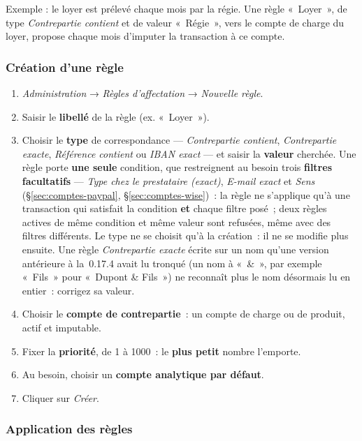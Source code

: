 \documentclass[a4paper,11pt,oneside]{article}
\begin{document}
Exemple : le loyer est prélevé chaque mois par la régie. Une règle «~Loyer~», de type \emph{Contrepartie contient} et de valeur «~Régie~», vers le compte de charge du loyer, propose chaque mois d'imputer la transaction à ce compte.

\subsubsection{Création d'une règle}

\begin{enumerate}
    \item \emph{Administration} → \emph{Règles d'affectation} → \emph{Nouvelle règle}.
    \item Saisir le \textbf{libellé} de la règle (ex. «~Loyer~»).
    \item Choisir le \textbf{type} de correspondance --- \emph{Contrepartie contient}, \emph{Contrepartie exacte}, \emph{Référence contient} ou \emph{IBAN exact} --- et saisir la \textbf{valeur} cherchée. Une règle porte \textbf{une seule} condition, que restreignent au besoin trois \textbf{filtres facultatifs} --- \emph{Type chez le prestataire (exact)}, \emph{E-mail exact} et \emph{Sens} (\S\ref{sec:comptes-paypal}, \S\ref{sec:comptes-wise})~: la règle ne s'applique qu'à une transaction qui satisfait la condition \textbf{et} chaque filtre posé~; deux règles actives de même condition et même valeur sont refusées, même avec des filtres différents. Le type ne se choisit qu'à la création~: il ne se modifie plus ensuite. Une règle \emph{Contrepartie exacte} écrite sur un nom qu'une version antérieure à la~0.17.4 avait lu tronqué (un nom à «~\&~», par exemple «~Fils~» pour «~Dupont \& Fils~») ne reconnaît plus le nom désormais lu en entier~: corrigez sa valeur.
    \item Choisir le \textbf{compte de contrepartie}~: un compte de charge ou de produit, actif et imputable.
    \item Fixer la \textbf{priorité}, de 1 à 1000~: le \textbf{plus petit} nombre l'emporte.
    \item Au besoin, choisir un \textbf{compte analytique par défaut}.
    \item Cliquer sur \emph{Créer}.
\end{enumerate}

\subsubsection{Application des règles}
\end{document}
